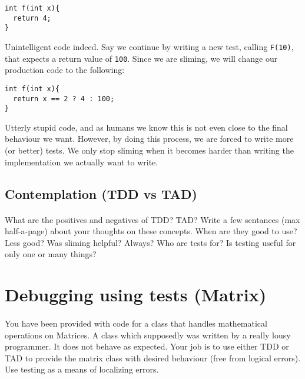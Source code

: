 \documentclass{article}
\begin{document}
      \begin{lstlisting}
int f(int x){
  return 4;
}
      \end{lstlisting}

      Unintelligent code indeed. Say we continue by writing a new test, calling \texttt{F(10)}, that expects a return value of \texttt{100}. Since we are sliming, we will change our production code to the following:

      \begin{lstlisting}
int f(int x){
  return x == 2 ? 4 : 100;
}
      \end{lstlisting}

      Utterly stupid code, and as humans we know this is not even close to the final behaviour we want. However, by doing this process, we are forced to write more (or better) tests. We only stop sliming when it becomes harder than writing the implementation we actually want to write.

  \subsection{ Contemplation (TDD vs TAD) }
    \paragraph{}
      What are the positives and negatives of TDD? TAD? Write a few sentances (max half-a-page) about your thoughts on these concepts. When are they good to use? Less good? Was sliming helpful? Always? Who are tests for? Is testing useful for only one or many things?









  \pagebreak
  \section{ Debugging using tests (Matrix) }
    \paragraph{}
      You have been provided with code for a class that handles mathematical operations on Matrices. A class which supposedly was written by a really lousy programmer. It does not behave as expected. Your job is to use either TDD or TAD to provide the matrix class with desired behaviour (free from logical errors). Use testing as a means of localizing errors.
\end{document}
